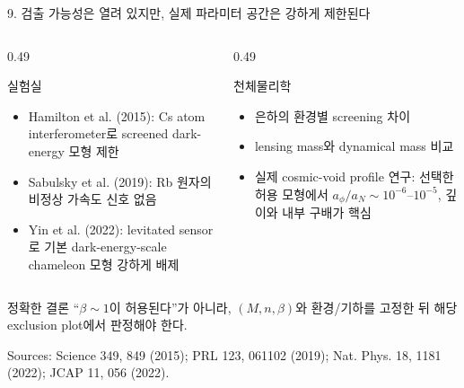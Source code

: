 \documentclass[10pt,aspectratio=169]{beamer}
\begin{document}
\begin{frame}{9. 검출 가능성은 열려 있지만, 실제 파라미터 공간은 강하게 제한된다}
 \begin{columns}[T]
  \begin{column}{0.49\textwidth}
   \begin{block}{실험실}
    \begin{itemize}
     \item Hamilton et al. (2015): Cs atom interferometer로 screened dark-energy 모형 제한
     \item Sabulsky et al. (2019): Rb 원자의 비정상 가속도 신호 없음
     \item Yin et al. (2022): levitated sensor로 기본 dark-energy-scale chameleon 모형 강하게 배제
    \end{itemize}
   \end{block}
  \end{column}
  \begin{column}{0.49\textwidth}
   \begin{block}{천체물리학}
    \begin{itemize}
     \item 은하의 환경별 screening 차이
     \item lensing mass와 dynamical mass 비교
     \item 실제 cosmic-void profile 연구: 선택한 허용 모형에서 $a_\phi/a_N\sim10^{-6}$--$10^{-5}$, 깊이와 내부 구배가 핵심
    \end{itemize}
   \end{block}
  \end{column}
 \end{columns}
 \begin{alertblock}{정확한 결론}
  ``$\beta\sim1$이 허용된다''가 아니라, $(M,n,\beta)$와 환경/기하를 고정한 뒤 해당 exclusion plot에서 판정해야 한다.
 \end{alertblock}
 \scriptsize Sources: Science 349, 849 (2015); PRL 123, 061102 (2019); Nat. Phys. 18, 1181 (2022); JCAP 11, 056 (2022).
\end{frame}
\end{document}

